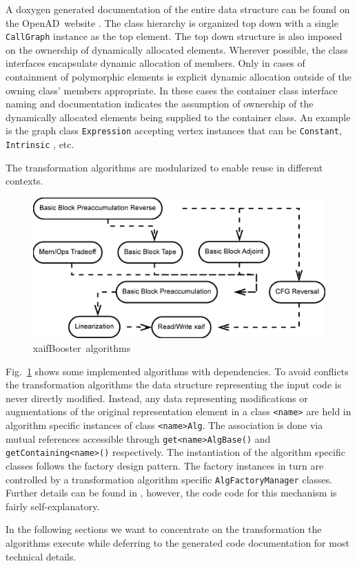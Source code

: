 \documentclass{book}
\newcommand{\OpenAD}{OpenAD}
\newcommand{\xaifBooster}{xaifBooster}
\newcommand{\reffig}[1]{{Fig.~\ref{#1}}}
\begin{document}
A doxygen generated documentation of the entire data structure 
can be found on the \OpenAD\ website \cite{openadWeb}.
The class hierarchy is organized top down with 
a single \lstinline{CallGraph} instance as the top element. 
The top down structure is also imposed on the ownership of dynamically 
allocated elements. 
Wherever possible, the class interfaces encapsulate dynamic 
allocation of members.  
Only in cases of containment of polymorphic elements is explicit dynamic allocation 
outside of the owning class' members appropriate. 
In these cases the container class interface naming and documentation 
indicates the assumption of ownership of 
the dynamically allocated elements being supplied to the container class. 
An example is the graph class \lstinline{Expression} accepting vertex instances that can be 
\lstinline{Constant}, \lstinline{Intrinsic} , etc.

The transformation algorithms are modularized to enable reuse in different 
contexts. 
\begin{figure}
  \centering \includegraphics[width=.45\textwidth]{allAlgs}
  \caption{\xaifBooster\ algorithms} \label{fig:allAlgs}
\end{figure}
\reffig{fig:allAlgs} shows some implemented algorithms with dependencies.
To avoid conflicts the transformation algorithms the data structure representing the input code  
is never directly modified. 
Instead, any data representing modifications or augmentations of the 
original representation element in a class \lstinline{<name>}
are held in algorithm specific instances of class \lstinline{<name>Alg}.
The association is done via mutual references accessible 
through \lstinline{get<name>AlgBase()} and \lstinline{getContaining<name>()} respectively.
The instantiation of the algorithm specific classes follows 
the factory design pattern. The factory instances in turn are controlled 
by a transformation algorithm specific \lstinline{AlgFactoryManager} classes. 
Further details can be found in \cite{UtNa03STI}, however, the code 
code for this mechanism is fairly self-explanatory.  

In the following sections we want to concentrate on the transformation 
the algorithms execute while deferring to the generated code 
documentation for most technical details.
\end{document}
